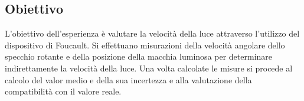 \subsection{Obiettivo}
L'obiettivo dell'esperienza è valutare la velocità della luce attraverso l'utilizzo del dispositivo di Foucault. Si effettuano misurazioni della velocità angolare dello specchio rotante e della posizione della macchia luminosa per determinare indirettamente la velocità della luce. Una volta calcolate le misure si procede al calcolo del valor medio e della sua incertezza e alla valutazione della compatibilità con il valore reale.

